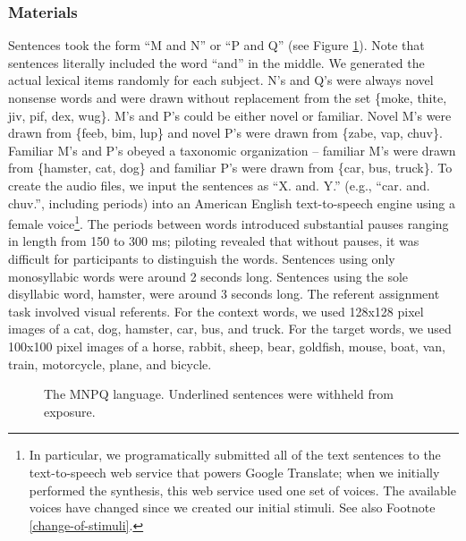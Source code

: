 \documentclass[man,floatsintext]{apa6}
\begin{document}
\subsubsection{Materials} Sentences took the form ``M and N'' or ``P
and Q'' (see Figure \ref{mnpq-table}). Note that sentences literally
included the word ``and'' in the middle. We generated the actual
lexical items randomly for each subject. N's and Q's were always novel
nonsense words and were drawn without replacement from the set \{moke,
thite, jiv, pif, dex, wug\}. M's and P's could be either novel or
familiar. Novel M's were drawn from \{feeb, bim, lup\} and novel P's
were drawn from \{zabe, vap, chuv\}. Familiar M's and P's obeyed a
taxonomic organization -- familiar M's were drawn from \{hamster, cat,
dog\} and familiar P's were drawn from \{car, bus, truck\}. To create
the audio files, we input the sentences as ``X. and. Y.'' (e.g.,
``car. and. chuv.'', including periods) into an American English
text-to-speech engine using a female voice\footnote{\label{tts}In
particular, we programatically submitted all of the text sentences to
the text-to-speech web service that powers Google Translate; when we
initially performed the synthesis, this web service used one set of
voices. The available voices have changed since we created our initial
stimuli. See also Footnote \ref{change-of-stimuli}.}. The periods
between words introduced substantial pauses ranging in length from 150
to 300 ms; piloting revealed that without pauses, it was difficult for
participants to distinguish the words. Sentences using only
monosyllabic words were around 2 seconds long. Sentences using the
sole disyllabic word, hamster, were around 3 seconds long.  The
referent assignment task involved visual referents. For the context
words, we used 128x128 pixel images of a cat, dog, hamster, car, bus,
and truck. For the target words, we used 100x100 pixel images of a
horse, rabbit, sheep, bear, goldfish, mouse, boat, van, train,
motorcycle, plane, and bicycle.

\begin{figure}[t]
  \begin{center} \vskip 0.12in 
    \caption{The MNPQ language. Underlined sentences were withheld
from exposure.}
    \label{mnpq-table}
  \end{center}
\end{figure}
\end{document}
